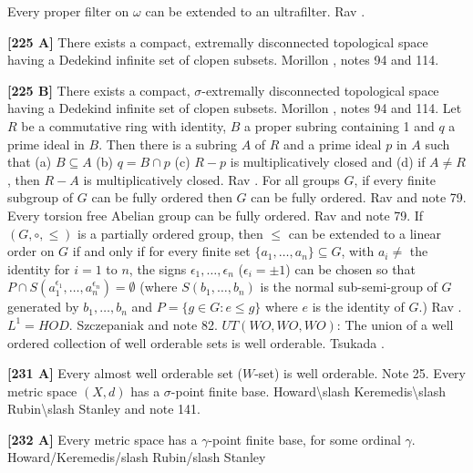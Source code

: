 \medskip
{}  Every proper filter on $\omega$ can be extended
to an ultrafilter.  \ac{Rav} \cite{1977}.
\smallskip
\item{}{\bf [225 A]}  There exists a compact, extremally disconnected
topological space having a Dedekind infinite set of clopen subsets.
\ac{Morillon} \cite{1993}, notes 94 and 114.
\smallskip
\item{}{\bf [225 B]}  There exists a compact, $\sigma$-extremally
disconnected topological space having a Dedekind infinite set
of clopen subsets.  \ac{Morillon} \cite{1993}, notes 94 and 114.
\medskip
{}  Let $R$ be a commutative ring with identity,
$B$ a proper subring containing 1 and $q$ a prime ideal in $B$.
Then there is a subring $A$ of $R$ and a prime ideal $p$ in $A$
such that (a) $B\subseteq A$ (b) $q = B\cap p$ (c) $R - p$ is
multiplicatively closed and (d) if $A\neq R$, then $R - A$ is
multiplicatively closed.  \ac{Rav} \cite{1977}.
\medskip
{} For all groups $G$, if every finite subgroup of
$G$ can be fully ordered then $G$ can be fully ordered. \ac{Rav}
\cite{1977} and note 79.
\medskip
{} Every torsion free Abelian group can be fully
ordered. \ac{Rav} \cite{1977} and note 79.
\medskip
{} If $(G,\circ,\le)$ is a partially ordered group,
then $\le$ can be extended to a linear order on $G$ if and only if
for every finite set $\{a_{1},\ldots, a_{n}\}\subseteq G$, with
$a_{i}\neq$ the identity for $i = 1$ to $n$, the signs $\epsilon_{1},
\ldots,\epsilon_{n}$ ($\epsilon_{i} = \pm 1$) can be chosen so that $P\cap
S(a^{\epsilon_{1}}_{1},\ldots,a^{\epsilon_{n}}_{n})=\emptyset$ (where
$S(b_{1},\ldots,b_{n})$ is the normal sub-semi-group of $G$ generated
by $b_{1},\ldots, b_{n}$ and $P = \{g\in G: e\le g\}$ where $e$ is
the identity of $G$.) \ac{Rav} \cite{1977}.
\medskip
{} $L^{1} = HOD$. \ac{Szczepaniak} \cite{1977} and
note 82.
\medskip
{} $UT(WO,WO,WO)$: The union of a well ordered
collection of well orderable sets is well orderable. \ac{Tsukada}
\cite{1977}.
\smallskip
\item{}{\bf [231 A]} Every almost well orderable set ($W$-set) is well
orderable.  Note 25.
\medskip
{} Every metric space $(X,d)$ has a $\sigma$-point
finite base.  \ac{Howard\slash Keremedis\slash Rubin\slash Stanley}
\cite{1999} and note 141.
\smallskip
\item{}{\bf [232 A]} Every metric space  has a $\gamma$-point finite base,
for some ordinal $\gamma$.  \ac{Howard/Keremedis/slash Rubin/slash
Stanley}
